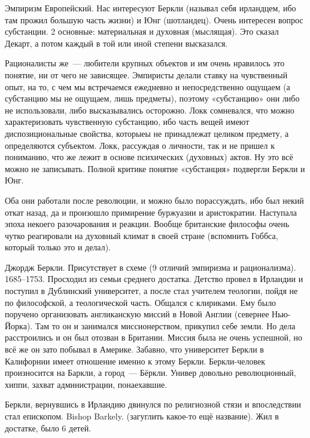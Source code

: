 Эмпиризм Европейский. Нас интересуют Беркли (называл себя ирландцем, ибо там прожил большую часть жизни) и Юнг (шотландец).
Очень интересен вопрос субстанции. 2 основные: материальная и духовная (мыслящая). Это сказал Декарт, а потом каждый в той или иной степени высказался. 

Рационалисты же~--- любители крупных объектов и им очень нравилось это понятие, ни от чего не зависящее. Эмпиристы делали ставку на чувственный опыт, на то, с чем мы встречаемся ежедневно и непосредственно ощущаем (а субстанцию мы не ощущаем, лишь предметы), поэтому «субстанцию» они либо не использовали, либо высказывались осторожно. 
Локк сомневался, что можно характеризовать чувственную субстанцию, ибо часть вещей имеют диспозициональные свойства, которыеы не принадлежат целиком предмету, а определяются субъектом. 
Локк, рассуждая о личности, так и не пришел к пониманию, что же лежит в основе психических (духовных) актов. Ну это всё можно не записывать. Полной критике понятие «субстанция» подвергли Беркли и Юнг.

Оба они работали после революции, и можно было порассуждать, ибо был некий откат назад, да и произошло примирение буржуазии и аристократии. Наступала эпоха некоего разочарования и реакции. Вообще британские философы очень чутко реагировали на духовный климат в своей стране (вспомнить Гоббса, который только это и делал). 

Джордж Беркли. Присутствует в схеме (9 отличий эмпиризма и рационализма). 1685--1753. Просходил из семьи среднего достатка. 
Детство провел в Ирландии и поступил в Дублинский университет, а после стал учителем теологии, пойдя не по философской, а теологической часть. Общался с клириками. 
Ему было поручено организовать англиканскую миссий в Новой Англии (севернее Нью-Йорка). Там то он и занимался миссионерством, прикупил себе земли. Но дела расстроились и он был отозван в Британии. Миссия была не очень успешной, но всё же он зато побывал в Америке. 
Забавно, что университет Беркли в Калифорнии имеет отношение именно к этому Беркли. Беркли-человек произносится на Баркли, а город~--- Бёркли. Универ довольно революционный, хиппи, захват администрации, понаехавшие. 

Беркли, вернувшись в Ирландию двинулся по религиозной стязи и впоследствии стал епископом. Bishop Barkely. (загуглить какое-то ещё название). Жил в достатке, было 6 детей.

